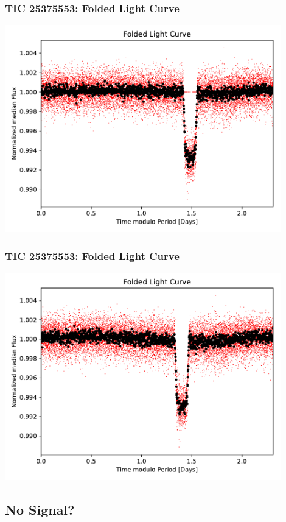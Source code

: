 \documentclass[notes]{beamer}
\begin{document}
\begin{frame}
\frametitle{TIC 25375553: Folded Light Curve}
\centering
\includegraphics[width=0.9\textwidth]{../figures/2019-1-16_12:58:51_Folded_TIC25375553.pdf}
\end{frame}

\begin{frame}
\frametitle{TIC 25375553: Folded Light Curve}
\centering
\includegraphics[width=0.9\textwidth]{../figures/2019-1-16_13:47:28_Folded_TIC25375553.pdf}
\end{frame}

\subsection{No Signal?}
\end{document}
